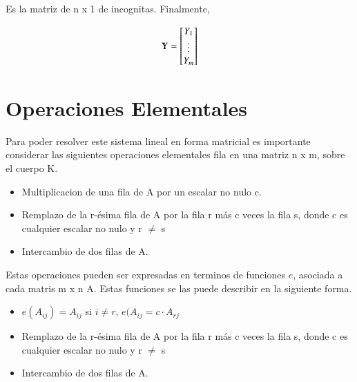 \documentclass[12pt]{article}
\begin{document}
Es la matriz de n x 1 de incognitas. Finalmente,

\[
\varmathbb{Y} = \begin{bmatrix}
	Y_{1} \\
    \vdots \\
   Y_{m}  \\
\end{bmatrix}
\]

\section{Operaciones Elementales}

Para poder resolver este sistema lineal en forma matricial es importante considerar las siguientes operaciones elementales fila en una matriz n x m, sobre el cuerpo K. 

\begin{itemize}
\item Multiplicacion de una fila de A por un escalar no nulo c.
\item Remplazo de la r-\'esima fila de A por la fila r m\'as c veces la fila s, donde c es cualquier escalar no nulo y r $\neq$ s
\item Intercambio de dos filas de A. 
\end{itemize}

Estas operaciones pueden ser expresadas en terminos de funciones $e$, asociada a cada matris m x n A. Estas funciones se las puede describir en la siguiente forma.  

\begin{itemize}
\item $e(A_{ij})=A_{ij}$ si $i \neq r$, $e(A_{ij} = c \cdot A_{rj}$ 
\item Remplazo de la r-\'esima fila de A por la fila r m\'as c veces la fila s, donde c es cualquier escalar no nulo y r $\neq$ s
\item Intercambio de dos filas de A. 
\end{itemize}


 
\end{document}
